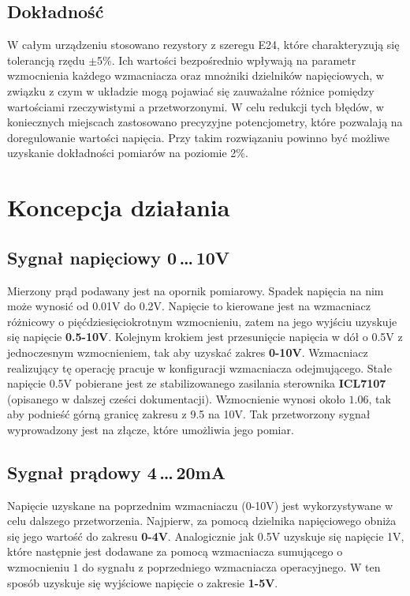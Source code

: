 \documentclass[12pt]{article}
\begin{document}
\subsection{Dokładność}
W całym urządzeniu stosowano rezystory z szeregu E24, które charakteryzują się tolerancją rzędu $\pm$5\%. Ich wartości bezpośrednio wpływają na parametr wzmocnienia każdego wzmacniacza oraz mnożniki dzielników napięciowych, w związku z czym w układzie mogą pojawiać się zauważalne różnice pomiędzy wartościami rzeczywistymi a przetworzonymi. W celu redukcji tych błędów, w koniecznych miejscach zastosowano precyzyjne potencjometry, które pozwalają na doregulowanie wartości napięcia. Przy takim rozwiązaniu powinno być możliwe uzyskanie dokładności pomiarów na poziomie 2\%. \\

\section{Koncepcja działania}\label{sec:koncepcja}
\subsection{Sygnał napięciowy 0\,\dots\,10V}\label{subsec:0-10V}
Mierzony prąd podawany jest na opornik pomiarowy. Spadek napięcia na nim może wynosić od 0.01V do 0.2V. Napięcie to kierowane jest na wzmacniacz różnicowy o pięćdziesięciokrotnym wzmocnieniu, zatem na jego wyjściu uzyskuje się napięcie \textbf{0.5-10V}. Kolejnym krokiem jest przesunięcie napięcia w dół o 0.5V z jednoczesnym wzmocnieniem, tak aby uzyskać zakres \textbf{0-10V}. Wzmacniacz realizujący tę operację pracuje w konfiguracji wzmacniacza odejmującego. Stałe napięcie 0.5V pobierane jest ze stabilizowanego zasilania sterownika \textbf{ICL7107} (opisanego w dalszej cześci dokumentacji). Wzmocnienie wynosi około $1.06$, tak aby podnieść górną granicę zakresu z 9.5 na 10V. Tak przetworzony sygnał wyprowadzony jest na złącze, które umożliwia jego pomiar.
\subsection{Sygnał prądowy 4\,\dots\,20mA}\label{subsec:4-20mA}
Napięcie uzyskane na poprzednim wzmacniaczu (0-10V) jest wykorzystywane w celu dalszego przetworzenia. Najpierw, za pomocą dzielnika napięciowego obniża się jego wartość do zakresu \textbf{0-4V}. Analogicznie jak 0.5V uzyskuje się napięcie 1V, które następnie jest dodawane za pomocą wzmacniacza sumującego o wzmocnieniu $1$ do sygnału z poprzedniego wzmacniacza operacyjnego. W ten sposób uzyskuje się wyjściowe napięcie o zakresie \textbf{1-5V}.
\end{document}
